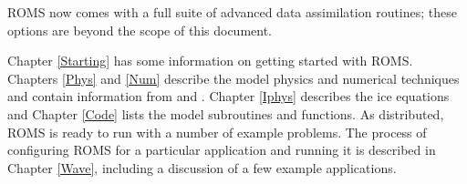 ROMS now comes with a full suite of advanced data assimilation
routines; these options are beyond the scope of this document.

Chapter \ref{Starting} has some information on getting started with
ROMS.
Chapters \ref{Phys} and \ref{Num} describe the model physics and
numerical techniques and contain information from 
\cite{SS2008b} and \cite{Haidvogel07}.
Chapter \ref{Iphys} describes the ice equations and
Chapter \ref{Code} lists the model subroutines and functions.
As distributed, ROMS is ready to run with a number of example problems.
The process of configuring ROMS for a particular application and
running it is
described in Chapter \ref{Wave}, including a discussion of a few example
applications.
